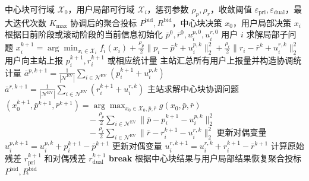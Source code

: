 \begin{algorithm}[htbp]
\caption{虚拟电厂两阶段分布式调度的 ADMM 求解流程}
\label{alg:vpp_admm_framework}
\begin{algorithmic}[1]
\Require 中心块可行域 $\mathcal{X}_0$，用户局部可行域 $\mathcal{X}_i$，惩罚参数 $\rho_p,\rho_r$，收敛阈值 $\varepsilon_{\mathrm{pri}},\varepsilon_{\mathrm{dual}}$，最大迭代次数 $K_{\max}$
\Ensure 协调后的聚合投标 $P^{\mathrm{bid}},R^{\mathrm{bid}}$，中心块决策 $x_0$，用户局部决策 $x_i$
\State 根据日前阶段或滚动阶段的当前信息初始化 $\bar p^0,\bar r^0,u_i^{p,0},u_i^{r,0}$
		\State 用户 $i$ 求解局部子问题
		\Statex \hspace{1.5em}$x_i^{k+1}=\arg\min_{x_i\in\mathcal{X}_i} f_i(x_i)+\frac{\rho_p}{2}\lVert p_i-\bar p^k+u_i^{p,k}\rVert_2^2+\frac{\rho_r}{2}\lVert r_i-\bar r^k+u_i^{r,k}\rVert_2^2$
		\State 用户向主站上报 $p_i^{k+1},r_i^{k+1}$ 或相应统计量
	\EndFor
	\State 主站汇总所有用户上报量并构造协调统计量
	\Statex \hspace{1.5em}$\bar a^{p,k+1}=\frac{1}{|\mathcal{N}^{\mathrm{EV}}|}\sum_{i\in\mathcal{N}^{\mathrm{EV}}}(p_i^{k+1}+u_i^{p,k})$
	\Statex \hspace{1.5em}$\bar a^{r,k+1}=\frac{1}{|\mathcal{N}^{\mathrm{EV}}|}\sum_{i\in\mathcal{N}^{\mathrm{EV}}}(r_i^{k+1}+u_i^{r,k})$
	\State 主站求解中心块协调问题
	\Statex \hspace{1.5em}$(x_0^{k+1},\bar p^{k+1},\bar r^{k+1})=\arg\max_{x_0\in\mathcal{X}_0,\bar p,\bar r} g(x_0,\bar p,\bar r)$
	\Statex \hspace{1.5em}$\qquad\qquad\qquad\qquad\qquad -\frac{\rho_p}{2}\sum_{i\in\mathcal{N}^{\mathrm{EV}}}\lVert \bar p-p_i^{k+1}-u_i^{p,k}\rVert_2^2$
	\Statex \hspace{1.5em}$\qquad\qquad\qquad\qquad\qquad -\frac{\rho_r}{2}\sum_{i\in\mathcal{N}^{\mathrm{EV}}}\lVert \bar r-r_i^{k+1}-u_i^{r,k}\rVert_2^2$
		\State 更新对偶变量 $u_i^{p,k+1}=u_i^{p,k}+p_i^{k+1}-\bar p^{k+1}$
		\State 更新对偶变量 $u_i^{r,k+1}=u_i^{r,k}+r_i^{k+1}-\bar r^{k+1}$
	\EndFor
	\State 计算原始残差 $r_{\mathrm{pri}}^{k+1}$ 和对偶残差 $r_{\mathrm{dual}}^{k+1}$
		\State \textbf{break}
	\EndIf
\EndFor
\State 根据中心块结果与用户局部结果恢复聚合投标 $P^{\mathrm{bid}},R^{\mathrm{bid}}$
\end{algorithmic}
\end{algorithm}


